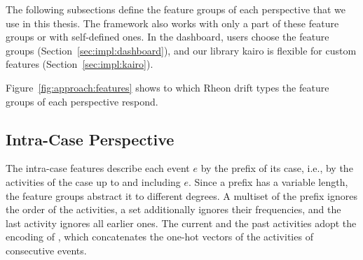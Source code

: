The following subsections define the feature groups of each perspective that we use in this thesis. The framework also works with only a part of these feature groups or with self-defined ones. In the dashboard, users choose the feature groups (Section~\ref{sec:impl:dashboard}), and our library kairo is flexible for custom features (Section~\ref{sec:impl:kairo}).

Figure~\ref{fig:approach:features} shows to which Rheon drift types the feature groups of each perspective respond.

\subsection{Intra-Case Perspective}
\label{sec:approach:features:intra}
The intra-case features describe each event $e$ by the prefix of its case, i.e., by the activities of the case up to and including $e$. Since a prefix has a variable length, the feature groups abstract it to different degrees. A multiset of the prefix ignores the order of the activities, a set additionally ignores their frequencies, and the last activity ignores all earlier ones. The current and the past activities adopt the encoding of \textcite{berti2025ocel}, which concatenates the one-hot vectors of the activities of consecutive events.

